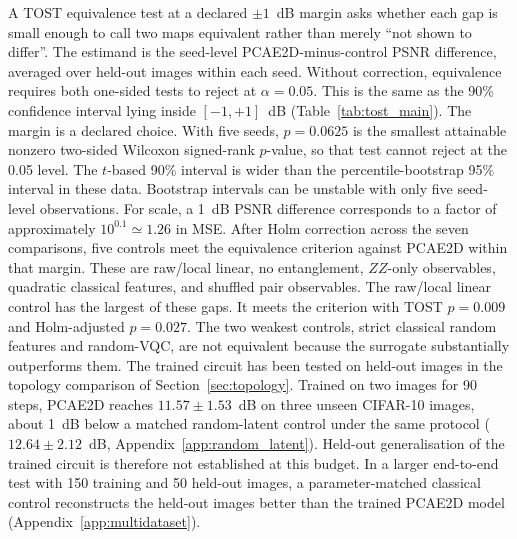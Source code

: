 \documentclass[pdflatex,sn-basic]{sn-jnl}
\begin{document}
A TOST equivalence test \citep{Schuirmann1987, Lakens2017} at a declared $\pm1$~dB margin asks whether each gap is small enough to call two maps equivalent rather than merely ``not shown to differ''.
The estimand is the seed-level PCAE2D-minus-control PSNR difference, averaged over held-out images within each seed.
Without correction, equivalence requires both one-sided tests to reject at $\alpha=0.05$.
This is the same as the 90\% confidence interval lying inside $[-1,+1]$~dB (Table~\ref{tab:tost_main}).
The margin is a declared choice.
With five seeds, $p=0.0625$ is the smallest attainable nonzero two-sided Wilcoxon signed-rank $p$-value, so that test cannot reject at the 0.05 level.
The $t$-based 90\% interval is wider than the percentile-bootstrap 95\% interval in these data.
Bootstrap intervals can be unstable with only five seed-level observations.
For scale, a 1~dB PSNR difference corresponds to a factor of approximately $10^{0.1}\simeq1.26$ in MSE.
After Holm correction \citep{Holm1979} across the seven comparisons, five controls meet the equivalence criterion against PCAE2D within that margin.
These are raw/local linear, no entanglement, $ZZ$-only observables, quadratic classical features, and shuffled pair observables.
The raw/local linear control has the largest of these gaps.
It meets the criterion with TOST $p=0.009$ and Holm-adjusted $p=0.027$.
The two weakest controls, strict classical random features and random-VQC, are not equivalent because the surrogate substantially outperforms them.
The trained circuit has been tested on held-out images in the topology comparison of Section~\ref{sec:topology}.
Trained on two images for 90 steps, PCAE2D reaches $11.57\pm1.53$~dB on three unseen CIFAR-10 images, about 1~dB below a matched random-latent control under the same protocol ($12.64\pm2.12$~dB, Appendix~\ref{app:random_latent}).
Held-out generalisation of the trained circuit is therefore not established at this budget.
In a larger end-to-end test with 150 training and 50 held-out images, a parameter-matched classical control reconstructs the held-out images better than the trained PCAE2D model (Appendix~\ref{app:multidataset}).
\end{document}
